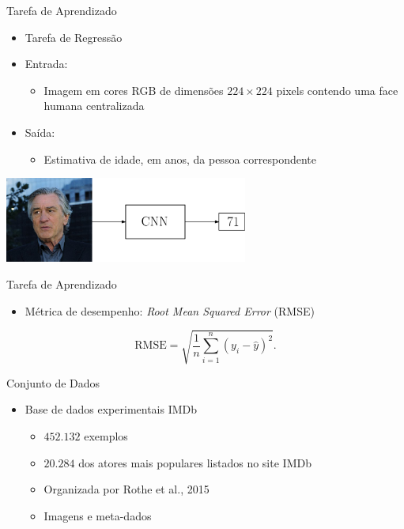 \begin{frame}{Tarefa de Aprendizado}
\begin{itemize}
  \item \alert{Tarefa de Regressão}
  \item \alert{Entrada}:
  \begin{itemize}
    \item Imagem em cores RGB de dimensões $224 \times 224$ pixels contendo uma face humana centralizada
  \end{itemize}
   \item \alert{Saída}:
   \begin{itemize}
        \item Estimativa de idade, em anos, da pessoa correspondente
   \end{itemize}
\end{itemize}
\begin{center}
     \includegraphics[width=0.60\textwidth]{img/deniro_cnn}
\end{center}
\end{frame}

\begin{frame}{Tarefa de Aprendizado}
     \begin{itemize}
          \item Métrica de desempenho: \emph{Root Mean Squared Error} (RMSE)
     \end{itemize}
     \begin{equation}\label{eq:rmse}
          \textrm{RMSE} = \sqrt{\frac{1}{n} \sum_{i=1}^n (y_i - \hat{y})^2}.
     \end{equation}
  \end{frame}

\begin{frame}{Conjunto de Dados}
  \begin{itemize}
    \item Base de dados experimentais IMDb
    \begin{itemize}
      \item $452.132$ exemplos
      \item $20.284$ dos atores mais populares listados no site IMDb
      \item Organizada por Rothe et al., 2015
      \item Imagens e meta-dados
    \end{itemize}
  \end{itemize}
\end{frame}

